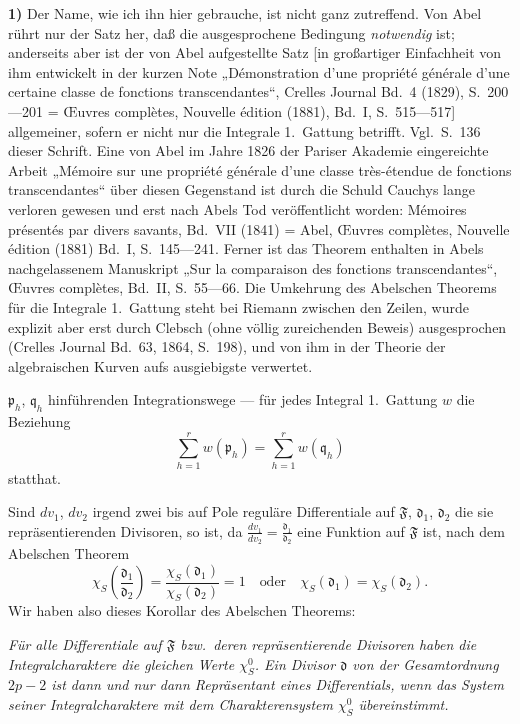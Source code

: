 \documentclass{article}
\begin{document}
\textbf{1)} Der Name, wie ich ihn hier gebrauche, ist nicht ganz zutreffend. Von Abel rührt nur der Satz her, daß die ausgesprochene Bedingung \emph{notwendig} ist; anderseits aber ist der von Abel aufgestellte Satz [in großartiger Einfachheit von ihm entwickelt in der kurzen Note „Démonstration d'une propriété générale d'une certaine classe de fonctions transcendantes“, Crelles Journal Bd.~4 (1829), S.~200---201 = Œuvres complètes, Nouvelle édition (1881), Bd.~I, S.~515---517] allgemeiner, sofern er nicht nur die Integrale 1.\ Gattung betrifft. Vgl.\ S.~136 dieser Schrift. Eine von Abel im Jahre 1826 der Pariser Akademie eingereichte Arbeit „Mémoire sur une propriété générale d'une classe très-étendue de fonctions transcendantes“ über diesen Gegenstand ist durch die Schuld Cauchys lange verloren gewesen und erst nach Abels Tod veröffentlicht worden: Mémoires présentés par divers savants, Bd.~VII (1841) = Abel, Œuvres complètes, Nouvelle édition (1881) Bd.~I, S.~145---241. Ferner ist das Theorem enthalten in Abels nachgelassenem Manuskript „Sur la comparaison des fonctions transcendantes“, Œuvres complètes, Bd.~II, S.~55---66. Die Umkehrung des Abelschen Theorems für die Integrale 1.\ Gattung steht bei Riemann zwischen den Zeilen, wurde explizit aber erst durch Clebsch (ohne völlig zureichenden Beweis) ausgesprochen (Crelles Journal Bd.~63, 1864, S.~198), und von ihm in der Theorie der algebraischen Kurven aufs ausgiebigste verwertet.

$\mathfrak{p}_h$, $\mathfrak{q}_h$ hinführenden Integrationswege --- für jedes Integral 1.\ Gattung $w$ die Beziehung
\[ \sum_{h=1}^r w(\mathfrak{p}_h) = \sum_{h=1}^r w(\mathfrak{q}_h) \]
statthat.

Sind $dv_1$, $dv_2$ irgend zwei bis auf Pole reguläre Differentiale auf $\mathfrak{F}$, $\mathfrak{d}_1$, $\mathfrak{d}_2$ die sie repräsentierenden Divisoren, so ist, da $\frac{dv_1}{dv_2} = \frac{\mathfrak{d}_1}{\mathfrak{d}_2}$ eine Funktion auf $\mathfrak{F}$ ist, nach dem Abelschen Theorem
\[ \chi_S\left( \frac{\mathfrak{d}_1}{\mathfrak{d}_2} \right) = \frac{\chi_S(\mathfrak{d}_1)}{\chi_S(\mathfrak{d}_2)} = 1 \quad\text{oder}\quad \chi_S(\mathfrak{d}_1) = \chi_S(\mathfrak{d}_2). \]
Wir haben also dieses Korollar des Abelschen Theorems:

\emph{Für alle Differentiale auf $\mathfrak{F}$ bzw.\ deren repräsentierende Divisoren haben die Integralcharaktere die gleichen Werte $\chi_S^0$. Ein Divisor $\mathfrak{d}$ von der Gesamtordnung $2p - 2$ ist dann und nur dann Repräsentant eines Differentials, wenn das System seiner Integralcharaktere mit dem Charakterensystem $\chi_S^0$ übereinstimmt.}
\end{document}
